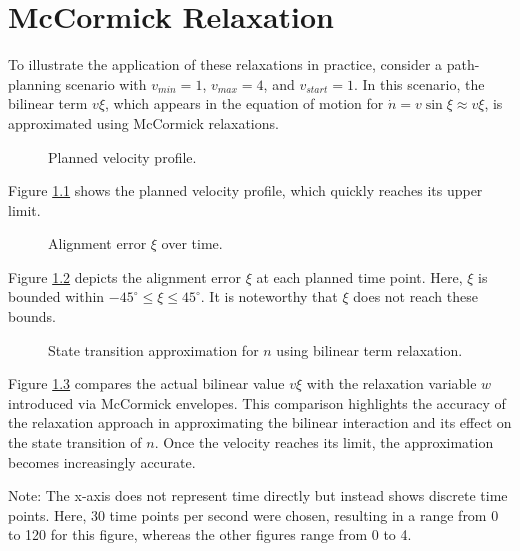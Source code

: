 \chapter{McCormick Relaxation}

To illustrate the application of these relaxations in practice, consider a path-planning scenario with \( v_{min} = 1 \), \( v_{max} = 4 \), and \(
v_{start} = 1 \).
In this scenario, the bilinear term \( v\xi \), which appears in the equation of motion for \(\dot{n} = v \sin{\xi} \approx v\xi\), is approximated
using McCormick relaxations.

\begin{figure}[h]
	\centering
	\resizebox{1\textwidth}{!}{}
	\caption{Planned velocity profile.}
	\label{fig:velocity}
\end{figure}

Figure \ref{fig:velocity} shows the planned velocity profile, which quickly reaches its upper limit.

\begin{figure}[h]
	\centering
	\resizebox{1\textwidth}{!}{}
	\caption{Alignment error \(\xi\) over time.}
	\label{fig:alignment-error}
\end{figure}

Figure \ref{fig:alignment-error} depicts the alignment error \( \xi \) at each planned time point.
Here, \( \xi \) is bounded within \(-45^{\circ} \leq \xi \leq 45^{\circ} \).
It is noteworthy that \( \xi \) does not reach these bounds.

\begin{figure}[h]
	\centering
	\resizebox{0.7\textwidth}{!}{}
	\caption{State transition approximation for \( n \) using bilinear term relaxation.}
	\label{fig:dn-term-approx}
\end{figure}

Figure \ref{fig:dn-term-approx} compares the actual bilinear value \( v\xi \) with the relaxation variable \( w \) introduced via McCormick
envelopes.
This comparison highlights the accuracy of the relaxation approach in approximating the bilinear interaction and its effect on the state transition
of \( n \).
Once the velocity reaches its limit, the approximation becomes increasingly accurate.

Note: The x-axis does not represent time directly but instead shows discrete time points.
Here, 30 time points per second were chosen, resulting in a range from 0 to 120 for this figure, whereas the other figures range from 0 to 4.

